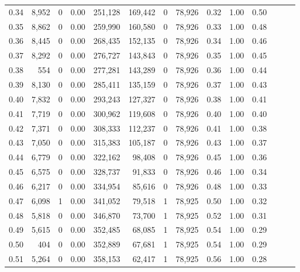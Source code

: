 \begin{tabular}{rrrrrrrrrrrrrr}
0.34 &   8,952 &      0 &  0.00 &  251,128 &  169,442 &       0 &  78,926 &  0.32 &  1.00 &      0.50 \\
0.35 &   8,862 &      0 &  0.00 &  259,990 &  160,580 &       0 &  78,926 &  0.33 &  1.00 &      0.48 \\
0.36 &   8,445 &      0 &  0.00 &  268,435 &  152,135 &       0 &  78,926 &  0.34 &  1.00 &      0.46 \\
0.37 &   8,292 &      0 &  0.00 &  276,727 &  143,843 &       0 &  78,926 &  0.35 &  1.00 &      0.45 \\
0.38 &     554 &      0 &  0.00 &  277,281 &  143,289 &       0 &  78,926 &  0.36 &  1.00 &      0.44 \\
0.39 &   8,130 &      0 &  0.00 &  285,411 &  135,159 &       0 &  78,926 &  0.37 &  1.00 &      0.43 \\
0.40 &   7,832 &      0 &  0.00 &  293,243 &  127,327 &       0 &  78,926 &  0.38 &  1.00 &      0.41 \\
0.41 &   7,719 &      0 &  0.00 &  300,962 &  119,608 &       0 &  78,926 &  0.40 &  1.00 &      0.40 \\
0.42 &   7,371 &      0 &  0.00 &  308,333 &  112,237 &       0 &  78,926 &  0.41 &  1.00 &      0.38 \\
0.43 &   7,050 &      0 &  0.00 &  315,383 &  105,187 &       0 &  78,926 &  0.43 &  1.00 &      0.37 \\
0.44 &   6,779 &      0 &  0.00 &  322,162 &   98,408 &       0 &  78,926 &  0.45 &  1.00 &      0.36 \\
0.45 &   6,575 &      0 &  0.00 &  328,737 &   91,833 &       0 &  78,926 &  0.46 &  1.00 &      0.34 \\
0.46 &   6,217 &      0 &  0.00 &  334,954 &   85,616 &       0 &  78,926 &  0.48 &  1.00 &      0.33 \\
0.47 &   6,098 &      1 &  0.00 &  341,052 &   79,518 &       1 &  78,925 &  0.50 &  1.00 &      0.32 \\
0.48 &   5,818 &      0 &  0.00 &  346,870 &   73,700 &       1 &  78,925 &  0.52 &  1.00 &      0.31 \\
0.49 &   5,615 &      0 &  0.00 &  352,485 &   68,085 &       1 &  78,925 &  0.54 &  1.00 &      0.29 \\
0.50 &     404 &      0 &  0.00 &  352,889 &   67,681 &       1 &  78,925 &  0.54 &  1.00 &      0.29 \\
0.51 &   5,264 &      0 &  0.00 &  358,153 &   62,417 &       1 &  78,925 &  0.56 &  1.00 &      0.28 \\

\end{tabular}
